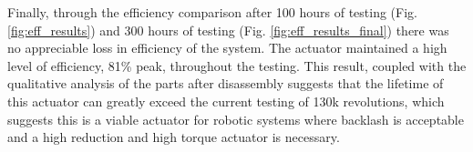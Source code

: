 Finally, through the efficiency comparison after 100 hours of testing (Fig. \ref{fig:eff_results}) and 300 hours of testing (Fig. \ref{fig:eff_results_final}) there was no appreciable loss in efficiency of the system. The actuator maintained a high level of efficiency, 81\% peak, throughout the testing. This result, coupled with the qualitative analysis of the parts after disassembly suggests that the lifetime of this actuator can greatly exceed the current testing of 130k revolutions, which suggests this is a viable actuator for robotic systems where backlash is acceptable and a high reduction and high torque actuator is necessary. 


